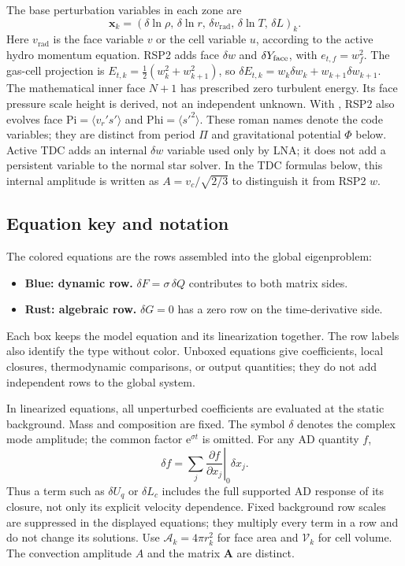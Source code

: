 \documentclass[11pt]{article}
\newcommand{\e}{\mathrm{e}}
\newcommand{\code}[1]{\texttt{\detokenize{#1}}}
\begin{document}
The base perturbation variables in each zone are
\begin{equation}
  \mathbf{x}_k=
  \left(\delta\ln\rho,\,\delta\ln r,\,\delta v_{\mathrm{rad}},\,
  \delta\ln T,\,\delta L\right)_k .
\end{equation}
Here $v_{\mathrm{rad}}$ is the face variable $v$ or the cell variable $u$,
according to the active hydro momentum equation.
RSP2 adds face $\delta w$ and $\delta Y_{\rm face}$, with $e_{t,f}=w_f^2$.
The gas-cell projection is $E_{t,k}=\tfrac12(w_k^2+w_{k+1}^2)$,
so $\delta E_{t,k}=w_k\delta w_k+w_{k+1}\delta w_{k+1}$.
The mathematical inner face $N+1$ has prescribed zero turbulent energy.
Its face pressure scale height is derived, not an independent unknown.
With \code{RSP2_use_3equation_model}, RSP2 also evolves face
$\mathrm{Pi}=\langle v_r's'\rangle$ and
$\mathrm{Phi}=\langle s'^2\rangle$. These roman names denote the code variables;
they are distinct from period $\Pi$ and gravitational potential $\Phi$ below.
Active TDC adds an internal
$\delta w$ variable used only by LNA; it does not add a persistent variable to
the normal star solver. In the TDC formulas below, this internal amplitude is
written as $A=v_c/\sqrt{2/3}$ to distinguish it from RSP2 $w$.


\subsection{Equation key and notation}

The colored equations are the rows assembled into the global eigenproblem:
\begin{itemize}
\setlength{\itemsep}{2pt}
\item \textcolor{LnaDynamic}{\textbf{Blue: dynamic row.}}
      $\delta F=\sigma\,\delta Q$ contributes to both matrix sides.
\item \textcolor{LnaAlgebraic}{\textbf{Rust: algebraic row.}}
      $\delta G=0$ has a zero row on the time-derivative side.
\end{itemize}
Each box keeps the model equation and its linearization together. The row
labels also identify the type without color. Unboxed equations give
coefficients, local closures, thermodynamic comparisons, or output
quantities; they do not add independent rows to the global system.

In linearized equations, all unperturbed coefficients are evaluated at the
static background. Mass and composition are fixed. The symbol $\delta$ denotes
the complex mode amplitude; the common factor $\e^{\sigma t}$ is omitted.
For any AD quantity $f$,
\begin{equation}
  \delta f=\sum_j\left.\frac{\partial f}{\partial x_j}\right|_0\delta x_j.
  \label{eq:ad-linearization}
\end{equation}
Thus a term such as $\delta U_q$ or $\delta L_c$ includes the full supported
AD response of its closure, not only its explicit velocity dependence.
Fixed background row scales are suppressed in the displayed equations; they
multiply every term in a row and do not change its solutions.
Use $\mathcal A_k=4\pi r_k^2$ for face area and $\mathcal V_k$ for cell
volume. The convection amplitude $A$ and the matrix $\mathbf A$ are distinct.
\end{document}
